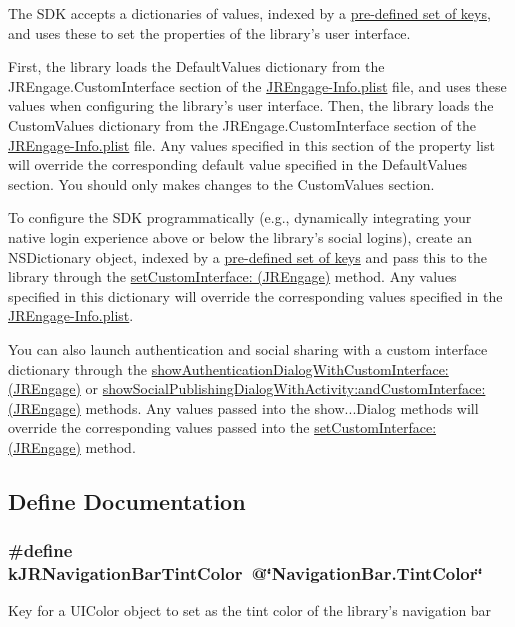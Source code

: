 The SDK accepts a dictionaries of values, indexed by a \hyperlink{group__custom_interface_customInterfaceKeys}{pre-\/defined set of keys}, and uses these to set the properties of the library's user interface.

First, the library loads the DefaultValues dictionary from the JREngage.CustomInterface section of the \hyperlink{_j_r_engage-_info_8plist}{JREngage-\/Info.plist} file, and uses these values when configuring the library's user interface. Then, the library loads the CustomValues dictionary from the JREngage.CustomInterface section of the \hyperlink{_j_r_engage-_info_8plist}{JREngage-\/Info.plist} file. Any values specified in this section of the property list will override the corresponding default value specified in the DefaultValues section. You should only makes changes to the CustomValues section.

To configure the SDK programmatically (e.g., dynamically integrating your native login experience above or below the library's social logins), create an NSDictionary object, indexed by a \hyperlink{group__custom_interface_customInterfaceKeys}{pre-\/defined set of keys} and pass this to the library through the \hyperlink{interface_j_r_engage_ab1757bbe9e83255b1b9128c630267fdf}{setCustomInterface: (JREngage)} method. Any values specified in this dictionary will override the corresponding values specified in the \hyperlink{_j_r_engage-_info_8plist}{JREngage-\/Info.plist}.

You can also launch authentication and social sharing with a custom interface dictionary through the \hyperlink{interface_j_r_engage_ac8e1206be8608fbed548b7ec5f85e6e6}{showAuthenticationDialogWithCustomInterface: (JREngage)} or \hyperlink{interface_j_r_engage_af5c2aa40f5c45a22f369900d1bd81953}{showSocialPublishingDialogWithActivity:andCustomInterface: (JREngage)} methods. Any values passed into the {\ttfamily show}...Dialog methods will override the corresponding values passed into the \hyperlink{interface_j_r_engage_ab1757bbe9e83255b1b9128c630267fdf}{setCustomInterface: (JREngage)} method. 

\subsection{Define Documentation}
\hypertarget{group__custom_interface_ga7c7ed7dac155537c9bc14531c5cec3cb}{
\subsubsection[{kJRNavigationBarTintColor}]{\setlength{\rightskip}{0pt plus 5cm}\#define kJRNavigationBarTintColor~@\char`\"{}NavigationBar.TintColor\char`\"{}}}
\label{group__custom_interface_ga7c7ed7dac155537c9bc14531c5cec3cb}
Key for a {\ttfamily UIColor} object to set as the tint color of the library's navigation bar

